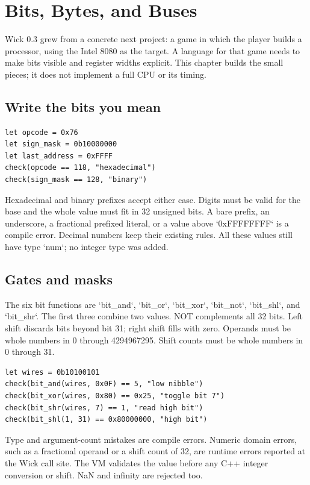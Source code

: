 \chapter{Bits, Bytes, and Buses}

Wick 0.3 grew from a concrete next project: a game in which the player builds
a processor, using the Intel 8080 as the target. A language for that game
needs to make bits visible and register widths explicit. This chapter builds
the small pieces; it does not implement a full CPU or its timing.

\section{Write the bits you mean}

\begin{lstlisting}[language=wick]
let opcode = 0x76
let sign_mask = 0b10000000
let last_address = 0xFFFF
check(opcode == 118, "hexadecimal")
check(sign_mask == 128, "binary")
\end{lstlisting}

Hexadecimal and binary prefixes accept either case. Digits must be valid for
the base and the whole value must fit in 32 unsigned bits. A bare prefix,
an underscore, a fractional prefixed literal, or a value above `0xFFFFFFFF`
is a compile error. Decimal numbers keep their existing rules. All these
values still have type `num`; no integer type was added.

\section{Gates and masks}

The six bit functions are `bit_and`, `bit_or`, `bit_xor`, `bit_not`,
`bit_shl`, and `bit_shr`. The first three combine two values. NOT complements
all 32 bits. Left shift discards bits beyond bit 31; right shift fills with
zero. Operands must be whole numbers in 0 through 4294967295. Shift counts
must be whole numbers in 0 through 31.

\begin{lstlisting}[language=wick]
let wires = 0b10100101
check(bit_and(wires, 0x0F) == 5, "low nibble")
check(bit_xor(wires, 0x80) == 0x25, "toggle bit 7")
check(bit_shr(wires, 7) == 1, "read high bit")
check(bit_shl(1, 31) == 0x80000000, "high bit")
\end{lstlisting}

Type and argument-count mistakes are compile errors. Numeric domain errors,
such as a fractional operand or a shift count of 32, are runtime errors
reported at the Wick call site. The VM validates the value before any C++
integer conversion or shift. NaN and infinity are rejected too.

